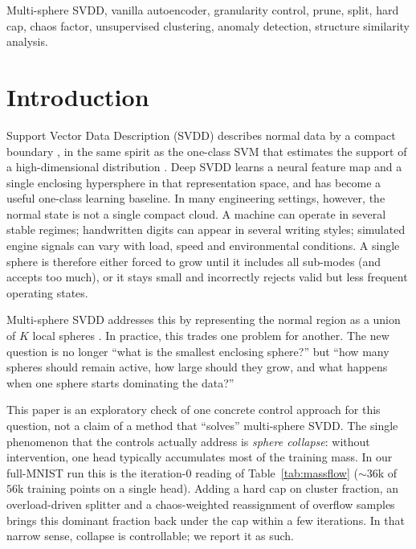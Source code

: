 \documentclass[conference]{IEEEtran}
\begin{document}
\begin{IEEEkeywords}
Multi-sphere SVDD, vanilla autoencoder, granularity control, prune, split, hard cap, chaos factor, unsupervised clustering, anomaly detection, structure similarity analysis.
\end{IEEEkeywords}

\section{Introduction}
Support Vector Data Description (SVDD) describes normal data by a compact boundary \cite{tax2004support}, in the same spirit as the one-class SVM that estimates the support of a high-dimensional distribution \cite{scholkopf2001estimating}. Deep SVDD \cite{ruff2018deep} learns a neural feature map and a single enclosing hypersphere in that representation space, and has become a useful one-class learning baseline. In many engineering settings, however, the normal state is not a single compact cloud. A machine can operate in several stable regimes; handwritten digits can appear in several writing styles; simulated engine signals can vary with load, speed and environmental conditions. A single sphere is therefore either forced to grow until it includes all sub-modes (and accepts too much), or it stays small and incorrectly rejects valid but less frequent operating states.

Multi-sphere SVDD addresses this by representing the normal region as a union of \(K\) local spheres \cite{ghafoori2020deep}. In practice, this trades one problem for another. The new question is no longer ``what is the smallest enclosing sphere?'' but ``how many spheres should remain active, how large should they grow, and what happens when one sphere starts dominating the data?''

This paper is an exploratory check of one concrete control approach for this question, not a claim of a method that ``solves'' multi-sphere SVDD. The single phenomenon that the controls actually address is \emph{sphere collapse}: without intervention, one head typically accumulates most of the training mass. In our full-MNIST run this is the iteration-0 reading of Table~\ref{tab:massflow} (\(\sim\!36\)k of \(56\)k training points on a single head). Adding a hard cap on cluster fraction, an overload-driven splitter and a chaos-weighted reassignment of overflow samples brings this dominant fraction back under the cap within a few iterations. In that narrow sense, collapse is controllable; we report it as such.
\end{document}
